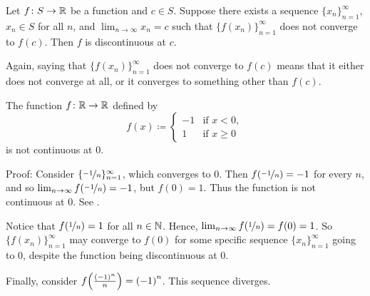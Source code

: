 \begin{prop}
Let $f \colon S \to {\mathbb{R}}$ be a function and $c \in S$.  Suppose 
there exists a sequence $\{ x_n \}_{n=1}^\infty$, $x_n \in S$ for all $n$,
and $\lim_{n\to\infty} x_n = c$
such that $\bigl\{ f(x_n) \bigr\}_{n=1}^\infty$
does not converge to $f(c)$.
Then $f$ is discontinuous at $c$.
\end{prop}

Again, 
saying that 
$\bigl\{ f(x_n) \bigr\}_{n=1}^\infty$ does not converge to $f(c)$
means that it
either does not converge
at all, or it converges to something
other than $f(c)$.

\begin{example} \label{example:jumpdiscont}
The function $f \colon {\mathbb{R}} \to {\mathbb{R}}$ defined by
\begin{equation*}
f(x) \coloneqq 
\begin{cases}
-1 & \text{if } x < 0, \\
1 & \text{if } x \geq 0
\end{cases}
\end{equation*}
is not continuous at 0.

Proof: Consider $\{ \nicefrac{-1}{n} \}_{n=1}^\infty$, which converges to 0.  Then
$f(\nicefrac{-1}{n}) = -1$ for every $n$,
and so
$\lim_{n\to\infty} f(\nicefrac{-1}{n}) = -1$, but $f(0) = 1$.  Thus the function is
not continuous at 0.  See
.

\begin{myfigureht}
\caption{Jump discontinuity.  The values of
$f(\nicefrac{-1}{n})$ and $f(0)$ are marked as black dots.\label{fig:jumpdiscont}}
\end{myfigureht}

Notice that $f(\nicefrac{1}{n}) = 1$ for all $n \in {\mathbb{N}}$.
Hence, $\lim_{n\to\infty} f(\nicefrac{1}{n}) = f(0) = 1$.  So
$\bigl\{ f(x_n) \bigr\}_{n=1}^\infty$ may converge to $f(0)$
for some specific
sequence $\{ x_n \}_{n=1}^\infty$ going to 0,
despite the function being discontinuous at 0.

Finally, consider $f\Bigl(\frac{{(-1)}^n}{n}\Bigr) = {(-1)}^n$.
This sequence diverges.
\end{example}

